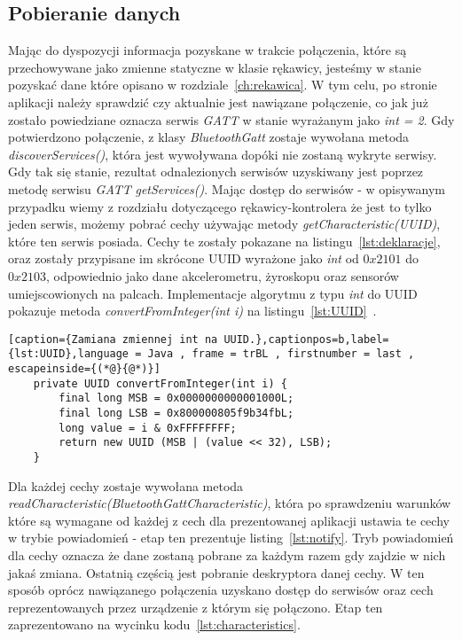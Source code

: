 	\subsection{Pobieranie danych}
	\label{subsec:dane}
	Mając do dyspozycji informacja pozyskane w trakcie połączenia, które są przechowywane jako zmienne statyczne w klasie rękawicy, jesteśmy w stanie pozyskać dane które opisano w rozdziale~\ref{ch:rekawica}. W tym celu, po stronie aplikacji należy sprawdzić czy aktualnie jest nawiązane połączenie, co jak już zostało powiedziane oznacza serwis \textit{GATT} w stanie wyrażanym jako \textit{int = 2}.  Gdy potwierdzono połączenie, z klasy \textit{BluetoothGatt} zostaje wywołana metoda \textit{discoverServices()}, która jest wywoływana dopóki nie zostaną wykryte serwisy. Gdy tak się stanie, rezultat odnalezionych serwisów uzyskiwany jest poprzez metodę serwisu \textit{GATT} \textit{getServices()}. Mając dostęp do serwisów - w opisywanym przypadku wiemy z rozdziału dotyczącego rękawicy-kontrolera że jest to tylko jeden serwis, możemy pobrać cechy używając metody \textit{getCharacteristic(UUID)}, które ten serwis posiada. Cechy te zostały pokazane na listingu~\ref{lst:deklaracje}, oraz zostały przypisane im skrócone UUID wyrażone jako \textit{int} od $0x2101$ do $0x2103$, odpowiednio jako dane akcelerometru, żyroskopu oraz sensorów umiejscowionych na palcach. Implementacje algorytmu z typu \textit{int} do UUID pokazuje metoda \textit{convertFromInteger(int i)} na listingu~\ref{lst:UUID}~\cite{UUID}. 
	\begin{lstlisting}[caption={Zamiana zmiennej int na UUID.},captionpos=b,label={lst:UUID},language = Java , frame = trBL , firstnumber = last , escapeinside={(*@}{@*)}]
	private UUID convertFromInteger(int i) {
        final long MSB = 0x0000000000001000L;
        final long LSB = 0x800000805f9b34fbL;
        long value = i & 0xFFFFFFFF;
        return new UUID (MSB | (value << 32), LSB);
    }                                                       
\end{lstlisting}
Dla każdej cechy zostaje wywołana metoda \textit{readCharacteristic(BluetoothGattCharacteristic)}, która po sprawdzeniu warunków które są wymagane od każdej z cech dla prezentowanej aplikacji ustawia te cechy w trybie powiadomień - etap ten prezentuje listing~\ref{lst:notify}. Tryb powiadomień dla cechy oznacza że dane zostaną pobrane za każdym razem gdy zajdzie w nich jakaś zmiana. Ostatnią częścią jest pobranie deskryptora danej cechy. W ten sposób oprócz nawiązanego połączenia uzyskano dostęp do serwisów oraz cech reprezentowanych przez urządzenie z którym się połączono. Etap ten zaprezentowano na wycinku kodu~\ref{lst:characteristics}.

